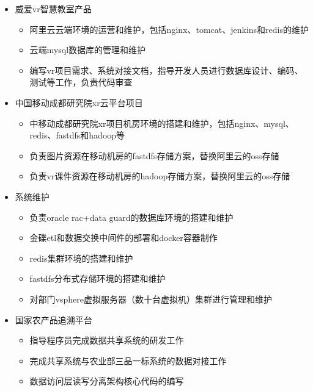 \begin{itemize}
  \item 威爱vr智慧教室产品
  \begin{itemize}
    \item 阿里云云端环境的运营和维护，包括nginx、tomcat、jenkins和redis的维护
    \item 云端mysql数据库的管理和维护
    \item 编写vr项目需求、系统对接文档，指导开发人员进行数据库设计、编码、测试等工作，负责代码审查
  \end{itemize}
  \item 中国移动成都研究院xr云平台项目
  \begin{itemize}
    \item 中移动成都研究院xr项目机房环境的搭建和维护，包括nginx、mysql、redis、fastdfs和hadoop等
    \item 负责图片资源在移动机房的fastdfs存储方案，替换阿里云的oss存储
    \item 负责vr课件资源在移动机房的hadoop存储方案，替换阿里云的oss存储
  \end{itemize}
\end{itemize}

\begin{itemize}
  \item 系统维护
  \begin{itemize}
    \item 负责oracle rac+data guard的数据库环境的搭建和维护
    \item 金碟etl和数据交换中间件的部署和docker容器制作
    \item redis集群环境的搭建和维护
    \item fastdfs分布式存储环境的搭建和维护
    \item 对部门vsphere虚拟服务器（数十台虚拟机）集群进行管理和维护
  \end{itemize}
  \item 国家农产品追溯平台
  \begin{itemize}
    \item 指导程序员完成数据共享系统的研发工作
    \item 完成共享系统与农业部三品一标系统的数据对接工作
    \item 数据访问层读写分离架构核心代码的编写
  \end{itemize}
\end{itemize}


